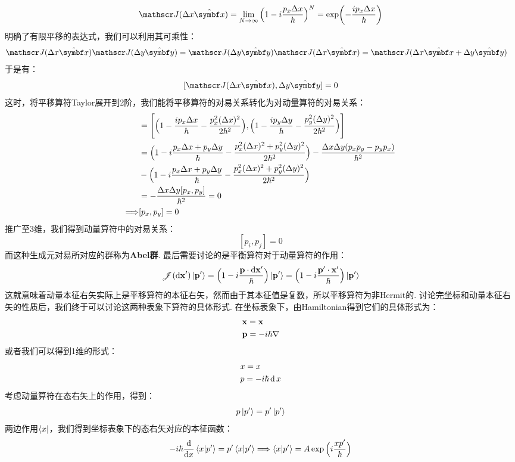 \[
\trans(\Delta{x}\uv{x}) = \lim_{N\to\infty}\Big(1 - i\frac{p_{x}\Delta{x}}{\hh}\Big)^{N} = \exp(-\frac{ip_{x}\Delta{x}}{\hh})
\]
明确了有限平移的表达式，我们可以利用其可乘性：
\begin{align*}
& \trans(\Delta{x}\uv{x})\trans(\Delta{y}\uv{y}) = \trans(\Delta{y}\uv{y})\trans(\Delta{x}\uv{x}) = \trans(\Delta{x}\uv{x} + \Delta{y}\uv{y})
\end{align*}
于是有：
\[
[\trans(\Delta{x}\uv{x}),\Delta{y}\uv{y}] = 0
\]
这时，将平移算符Taylor展开到2阶，我们能将平移算符的对易关系转化为对动量算符的对易关系：
\begin{align*}
[\trans(\Delta{x}\uv{x}),\Delta{y}\uv{y}] 
& = \Bigg[\Big(1-\frac{ip_{x}\Delta{x}}{\hh}-\frac{p_{x}^{2}(\Delta{x})^{2}}{2\hh^2}\Big) , \Big(1-\frac{ip_{y}\Delta{y}}{\hh}-\frac{p_{y}^{2}(\Delta{y})^{2}}{2\hh^2}\Big)\Bigg] \\
& = \Big(1 - i\frac{p_{x}\Delta{x}+p_{y}\Delta{y}}{\hh} - \frac{p_{x}^{2}(\Delta{x})^{2} + p_{y}^{2}(\Delta{y})^{2}}{2\hh^2}\Big) - \frac{\Delta{x}\Delta{y}(p_{x}p_{y}-p_{y}p_{x})}{\hh^2} \\
& - \Big(1 - i\frac{p_{x}\Delta{x}+p_{y}\Delta{y}}{\hh} - \frac{p_{x}^{2}(\Delta{x})^{2} + p_{y}^{2}(\Delta{y})^{2}}{2\hh^2}\Big) \\
& = -\frac{\Delta{x}\Delta{y}[p_{x},p_{y}]}{\hh^2} = 0 \\
\Longrightarrow 
& [p_{x},p_{y}] = 0
\end{align*}
推广至3维，我们得到动量算符中的对易关系：
\[
[p_{i},p_{j}] = 0
\]
而这种生成元对易所对应的群称为\textbf{Abel群}. 最后需要讨论的是平衡算符对于动量算符的作用：
\[
\mathscr{J}(\dd{\mathbf{x}}')\ket{\mathbf{p}'} = \Big(1 - i\frac{\mathbf{p}\cdot\dd\mathbf{x}'}{\hbar}\Big)\ket{\mathbf{p}'} = \Big(1 - i\frac{\mathbf{p}'\cdot\mathbf{x}'}{\hbar}\Big)\ket{\mathbf{p}'}
\]
这就意味着动量本征右矢实际上是平移算符的本征右矢，然而由于其本征值是复数，所以平移算符为非Hermit的. 讨论完坐标和动量本征右矢的性质后，我们终于可以讨论这两种表象下算符的具体形式. 在坐标表象下，由Hamiltonian得到它们的具体形式为：
\begin{align*}
& \mathbf{x} = \mathbf{x} \\
& \mathbf{p} = -i\hbar\nabla
\end{align*}
或者我们可以得到1维的形式：
\begin{align*}
& x = x \\
& p = -i\hbar\dd{}{x}
\end{align*}
考虑动量算符在态右矢上的作用，得到：
\[
p\ket{p'} = p'\ket{p'}
\]
两边作用\(\bra{x}\)，我们得到坐标表象下的态右矢对应的本征函数：
\[
-i\hbar\frac{\dd{}}{\dd{x}}\bra{x}\ket{p'} = p'\bra{x}\ket{p'} \Longrightarrow \bra{x}\ket{p'} = A\exp\Big(i\frac{xp'}{\hbar}\Big)
\]
